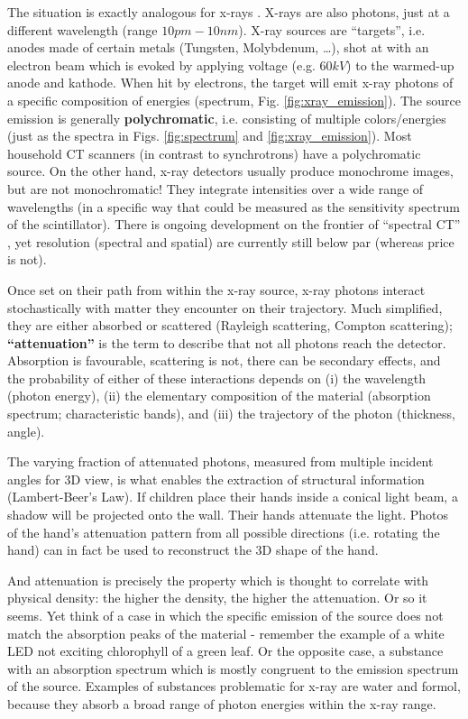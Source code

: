The situation is exactly analogous for x-rays \citep{Berger2018,Buzug2008}.
X-rays are also photons, just at a different wavelength (range \(10pm - 10nm\)).
X-ray sources are ``targets'', i.e. anodes made of certain metals (Tungsten, Molybdenum, \ldots{}), shot at with an electron beam which is evoked by applying voltage (e.g. \(60 kV\)) to the warmed-up anode and kathode.
When hit by electrons, the target will emit x-ray photons of a specific composition of energies (spectrum, Fig. \ref{fig:xray_emission}).
The source emission is generally \textbf{polychromatic}, i.e. consisting of multiple colors/energies (just as the spectra in Figs. \ref{fig:spectrum} and \ref{fig:xray_emission}).
Most household CT scanners (in contrast to synchrotrons) have a polychromatic source.
On the other hand, x-ray detectors usually produce monochrome images, but are not monochromatic!
They integrate intensities over a wide range of wavelengths (in a specific way that could be measured as the sensitivity spectrum of the scintillator).
There is ongoing development on the frontier of ``spectral CT'' \citep{Liu2023}, yet resolution (spectral and spatial) are currently still below par (whereas price is not).


Once set on their path from within the x-ray source, x-ray photons interact stochastically with matter they encounter on their trajectory.
Much simplified, they are either absorbed or scattered (Rayleigh scattering, Compton scattering); \textbf{``attenuation''} is the term to describe that not all photons reach the detector.
Absorption is favourable, scattering is not, there can be secondary effects, and the probability of either of these interactions depends on (i) the wavelength (photon energy), (ii) the elementary composition of the material (absorption spectrum; characteristic bands), and (iii) the trajectory of the photon (thickness, angle).


The varying fraction of attenuated photons, measured from multiple incident angles for 3D view, is what enables the extraction of structural information (Lambert-Beer's Law).
If children place their hands inside a conical light beam, a shadow will be projected onto the wall.
Their hands attenuate the light.
Photos of the hand's attenuation pattern from all possible directions (i.e. rotating the hand) can in fact be used to reconstruct the 3D shape of the hand.

And attenuation is precisely the property which is thought to correlate with physical density: the higher the density, the higher the attenuation.
Or so it seems.
Yet think of a case in which the specific emission of the source does not match the absorption peaks of the material - remember the example of a white LED not exciting chlorophyll of a green leaf.
Or the opposite case, a substance with an absorption spectrum which is mostly congruent to the emission spectrum of the source.
Examples of substances problematic for x-ray are water and formol, because they absorb a broad range of photon energies within the x-ray range.


